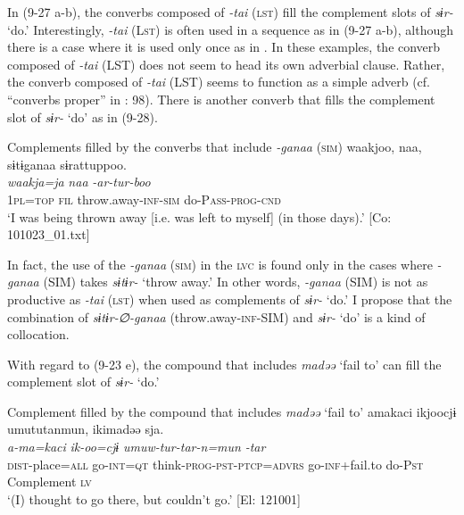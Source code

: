 In (9-27 a-b), the converbs composed of \textit{{}-tai} (\textsc{lst}) fill the complement slots of \textit{sɨr-} ‘do.’ Interestingly, \textit{{}-tai} (L\textsc{st}) is often used in a sequence as in (9-27 a-b), although there is a case where it is used only once as in . In these examples, the converb composed of \textit{{}-tai} (LST) does not seem to head its own adverbial clause. Rather, the converb composed of \textit{{}-tai} (LST) seems to function as a simple adverb (cf. “converbs proper” in \citealt{Nedjalkov1995}: 98). There is another converb that fills the complement slot of \textit{sɨr-} ‘do’ as in (9-28).

\ea   Complements filled by the converbs that include \textit{{}-ganaa} (\textsc{sim}) \label{ex:9.28}
 \glll  waakjoo,  naa,  sɨtɨganaa  sɨrattuppoo.\\
    \textit{waakja=ja}  \textit{naa}  \textit{}  \textit{-ar-tur-boo}\\
    1\textsc{pl}=\textsc{top}  \textsc{fil}  throw.away-\textsc{inf}-\textsc{sim}  do-P\textsc{ass}-\textsc{prog}-\textsc{cnd}\\
    \glt     ‘I was being thrown away [i.e. was left to myself] (in those days).’ [Co: 101023\_01.txt]
\z

In fact, the use of the \textit{{}-ganaa} (\textsc{sim}) in the \textsc{lvc} is found only in the cases where \textit{{}-ganaa} (SIM) takes \textit{sɨtɨr-} ‘throw away.’ In other words, \textit{{}-ganaa} (SIM) is not as productive as \textit{{}-tai} (\textsc{lst}) when used as complements of \textit{sɨr-} ‘do.’ I propose that the combination of \textit{sɨtɨr-∅-ganaa} (throw.away-\textsc{inf}-SIM) and \textit{sɨr-} ‘do’ is a kind of collocation.

With regard to (9-23 e), the compound that includes \textit{madəə} ‘fail to’ can fill the complement slot of \textit{sɨr-} ‘do.’

\ea   Complement filled by the compound that includes \textit{madəə} ‘fail to’ \label{ex:9.29}
 \gllll  amakaci  ikjoocjɨ  umututanmun,   ikimadəə  sja.  \\
    \textit{a-ma=kaci}  \textit{ik-oo=cjɨ}  \textit{umuw-tur-tar-n=mun}    \textit{}  \textit{-tar} \\
    \textsc{dist}-place=\textsc{all}  go-\textsc{int}=\textsc{qt}  think-\textsc{prog}-\textsc{pst}-\textsc{ptcp}=\textsc{advrs}  go-\textsc{inf}+fail.to  do-P\textsc{st}  \\
                                                           Complement  \textsc{lv}  \\
  \glt     ‘(I) thought to go there, but couldn’t go.’ [El: 121001]
\z

